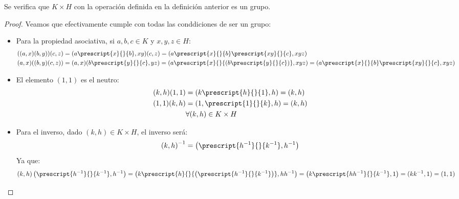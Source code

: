 \begin{prop}
    Se verifica que $K\times H$ con la operación definida en la definición anterior es un grupo.
    \begin{proof}
        Veamos que efectivamente cumple con todas las conddiciones de ser un grupo:
        \begin{itemize}
            \item Para la propiedad asociativa, si $a,b,c\in K$ y $x,y,z\in H$:
                \begin{align*}
                    ((a,x)(b,y))(c,z) &= (a\prescript{x}{}{b},xy)(c,z) = (a\prescript{x}{}{b}\prescript{xy}{}{c}, xyz) \\
                    (a,x)((b,y)(c,z)) &= (a,x)(b\prescript{y}{}{c}, yz) = (a\prescript{x}{}{(b\prescript{y}{}{c})}, xyz) = (a\prescript{x}{}{b}\prescript{xy}{}{c},xyz)
                \end{align*}
            \item El elemento $(1,1)$ es el neutro:
                \begin{align*}
                    (k,h)(1,1) &= (k\prescript{h}{}{1},h) = (k,h) \\
                    (1,1)(k,h) &= (1, \prescript{1}{}{k},h) = (k,h) \\
                               &\forall (k,h)\in K\times H
                \end{align*}
            \item Para el inverso, dado $(k,h)\in K\times H$, el inverso será:
                \begin{equation*}
                    {(k,h)}^{-1} = \left(\prescript{h^{-1}}{}{k^{-1}},h^{-1}\right)
                \end{equation*}
                Ya que:
                \begin{equation*}
                    (k,h)\left(\prescript{h^{-1}}{}{k^{-1}},h^{-1}\right) = \left(k\prescript{h}{}{\left(\prescript{h^{-1}}{}{k^{-1}}\right)}, hh^{-1}\right) = \left(k\prescript{hh^{-1}}{}{k^{-1}}, 1\right) = (kk^{-1},1) = (1,1)
                \end{equation*}
        \end{itemize}
    \end{proof}
\end{prop}

